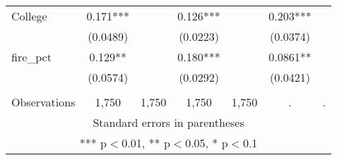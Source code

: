 \begin{tabular}{lcccccc}
College & 0.171*** &  & 0.126*** &  & 0.203*** &  \\
 & (0.0489) &  & (0.0223) &  & (0.0374) &  \\
fire\_pct & 0.129** &  & 0.180*** &  & 0.0861** &  \\
 & (0.0574) &  & (0.0292) &  & (0.0421) &  \\
 &  &  &  &  &  &  \\
 Observations & 1,750 & 1,750 & 1,750 & 1,750 & . & . \\ \hline
\multicolumn{7}{c}{ Standard errors in parentheses} \\
\multicolumn{7}{c}{ *** p$<$0.01, ** p$<$0.05, * p$<$0.1} \\
\end{tabular}
